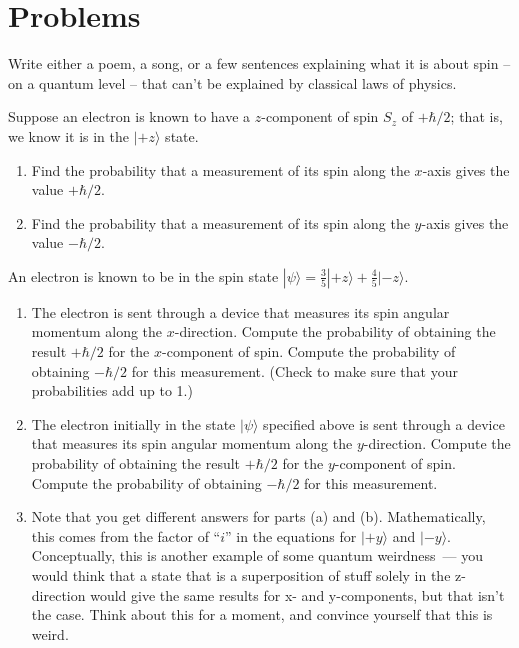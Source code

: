 \newpage

\section*{Problems}

\begin{problem}
Write either a poem, a song, or a few sentences explaining
what it is about spin -- on a quantum level -- that can't be
explained by classical laws of physics. \label{prob:spin_poem}
\end{problem}


\begin{problem}
Suppose an electron is known to have a $z$-component of spin $S_z$ of $+\hbar/2$; that is, we know it is in the $|\mbox{$+z$}\rangle$ state.
\begin{enumerate} 
\item   Find the probability that a measurement of
    its spin along the $x$-axis gives the value $+\hbar/2$.
\item Find the probability that a measurement of its spin along
    the $y$-axis gives the value $-\hbar/2$.
 \end{enumerate}
\label{prob:spin_i}
\end{problem}

\begin{problem}
An electron is known to be in the spin state $|\psi\rangle =
  \frac{3}{5}|\mbox{$+z$}\rangle + \frac{4}{5}|\mbox{$-z$}\rangle$.

  \begin{enumerate}
  \item The electron is sent
  through a device that measures its spin angular momentum along the
  $x$-direction.  Compute the probability of obtaining the result
  $+\hbar/2$ for the $x$-component of spin.  Compute the
  probability of obtaining $-\hbar/2$ for this measurement.  (Check to make
  sure that your probabilities add up to 1.)
  \item The electron initially in the state $|\psi\rangle$ specified
  above is sent through a device that measures its spin angular
  momentum along the $y$-direction.  Compute the probability of
  obtaining the result $+\hbar/2$ for the $y$-component of spin.
  Compute the probability of obtaining $-\hbar/2$ for this
  measurement.
  \item Note that you get different answers for parts (a) and (b).
  Mathematically, this comes from the factor of ``$i$'' in the
  equations for $|\mbox{$+y$}\rangle$ and $|\mbox{$-y$}\rangle$.
  Conceptually, this is another example of some quantum weirdness~---
  you would think that a state that is a superposition of stuff solely
  in the z-direction would give the same results for x- and
  y-components, but that isn't the case.  Think about this for a
  moment, and convince yourself that this is weird.
 \end{enumerate}
\label{prob:spin_ii}
\end{problem}


